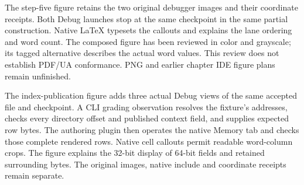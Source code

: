 The step-five figure retains the two original debugger images and their coordinate
receipts. Both Debug launches stop at the same checkpoint in the same partial
construction. Native LaTeX typesets the callouts and explains the lane ordering and
word count. The composed figure has been reviewed in color and grayscale; its tagged
alternative describes the actual word values. This review does not establish
PDF/UA conformance. PNG and earlier chapter IDE figure plans remain unfinished.


The index-publication figure adds three actual Debug views of the same accepted
file and checkpoint. A CLI grading observation resolves the fixture's addresses,
checks every directory offset and published context field, and supplies expected
row bytes. The authoring plugin then operates the native Memory tab and checks
those complete rendered rows. Native cell callouts permit readable word-column
crops. The figure explains the 32-bit display of 64-bit fields and retained surrounding bytes.
The original images, native include and coordinate receipts remain separate.
